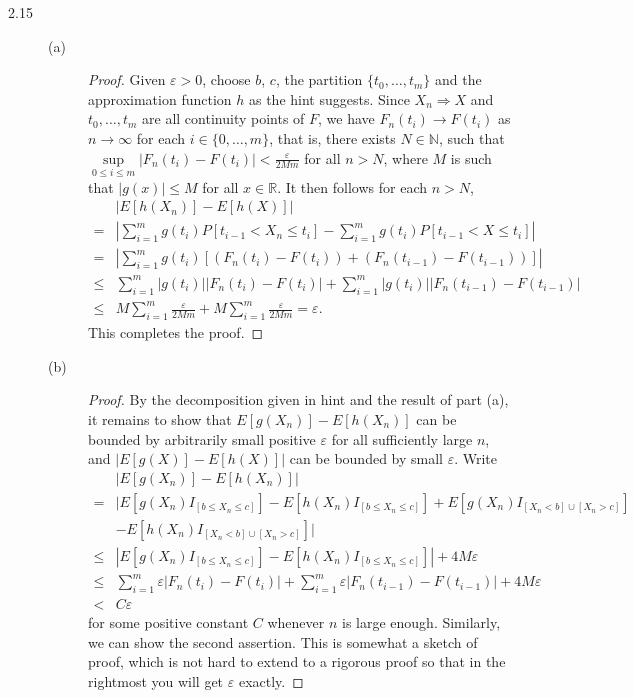 \documentclass{article}
\newcommand{\eps}{\varepsilon}
\newcommand{\real}{\mathbb{R}}
\newcommand{\nn}{\mathbb{N}}
\theoremstyle{definition}
\theoremstyle{plain}
\theoremstyle{remark}
\begin{document}
\begin{description}
\item[2.15]
\begin{description}
\item[(a)]
\begin{proof}
Given $\eps > 0$, choose $b$, $c$, the partition $\{t_0, \ldots, t_m\}$ and the approximation function $h$ as the hint suggests. Since $X_n \Rightarrow X$ and $t_0, \ldots, t_m$ are all continuity points of $F$, we have $F_n(t_i) \to F(t_i)$ as $n \to \infty$ for each $i \in \{0, \ldots, m\}$, that is, there exists $N \in \nn$, such that $\sup\limits_{0 \leq i \leq m}|F_n(t_i) - F(t_i)| < \frac{\eps}{2Mm}$ for all $n > N$, where $M$ is such that $|g(x)| \leq M$ for all $x \in \real$. It then follows for each $n > N$,
\begin{align*}
& |E[h(X_n)] - E[h(X)]| \\
= & \left|\sum_{i = 1}^m g(t_i)P[t_{i - 1} < X_n \leq t_i] - \sum_{i = 1}^m g(t_i)P[t_{i - 1} < X \leq t_i]\right| \\
= & \left|\sum_{i = 1}^m g(t_i)[(F_n(t_i) - F(t_i)) + (F_n(t_{i - 1}) - F(t_{i - 1}))]\right| \\
\leq &  \sum_{i = 1}^m |g(t_i)||F_n(t_i) - F(t_i)| + \sum_{i = 1}^m |g(t_i)||F_n(t_{i - 1}) - F(t_{i - 1})| \\
\leq & M\sum_{i = 1}^m \frac{\eps}{2Mm} +  M\sum_{i = 1}^m \frac{\eps}{2Mm} = \eps.
\end{align*}
This completes the proof.
\end{proof}

\item[(b)]
\begin{proof}
By the decomposition given in hint and the result of part (a), it remains to show that $E[g(X_n)] - E[h(X_n)]$ can be bounded by arbitrarily small positive $\eps$ for all sufficiently large $n$, and $|E[g(X)] - E[h(X)]|$ can be bounded by small $\eps$. 
Write
\begin{align*}
& |E[g(X_n)] - E[h(X_n)]| \\
= & |E[g(X_n)I_{[b \leq X_n \leq c]}] - E[h(X_n)I_{[b \leq X_n \leq c]}] + E[g(X_n)I_{[X_n < b] \cup [X_n > c]}] \\
& - E[h(X_n)I_{[X_n < b] \cup [X_n > c]}]| \\
\leq & |E[g(X_n)I_{[b \leq X_n \leq c]}] - E[h(X_n)I_{[b \leq X_n \leq c]}]| + 4M\eps \\
\leq & \sum_{i = 1}^m \eps |F_n(t_i) - F(t_i)| + \sum_{i = 1}^m \eps |F_n(t_{i - 1}) - F(t_{i - 1})| + 4M\eps \\
< & C\eps
\end{align*}
for some positive constant $C$ whenever $n$ is large enough. Similarly, we can show the second assertion. This is somewhat a sketch of proof, which is not hard to extend to a rigorous proof so that in the rightmost you will get $\eps$ exactly.
\end{proof}
\end{description}


\end{description}
\end{document}
